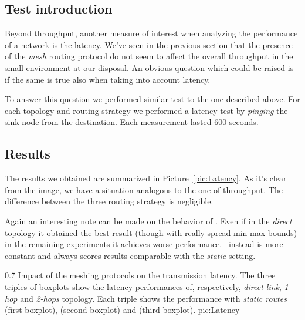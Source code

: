 \clearpage
\subsection{Test introduction}
    Beyond throughput, another measure of interest when analyzing the
    performance of a network is the latency. We've seen in the
    previous section that the presence of the \emph{mesh} routing
    protocol do not seem to affect the overall throughput in the small
    environment at our disposal. An obvious question which could be
    raised is if the same is true also when taking into account latency.

    To answer this question we performed similar test to the one
    described above. For each topology and routing strategy we
    performed a latency test by \emph{pinging} the sink node from the
    destination. Each measurement lasted 600 seconds.

\subsection{Results}
The results we obtained are summarized in
Picture~\ref{pic:Latency}. As it's clear from the image, we have a
situation analogous to the one of throughput. The difference between
the three routing strategy is negligible.

Again an interesting note can be made on the behavior of \olsr. Even
if in the \emph{direct} topology it obtained the best result (though
with really spread min-max bounds) in the remaining experiments it
achieves worse performance. \batman\ instead is more constant and
always scores results comparable with the \emph{static} setting.

        {0.7 \columnwidth}
        {Impact of the meshing protocols on the transmission latency. The
         three triples of boxplots show the latency performances of,
         respectively, \emph{direct link}, \emph{1-hop} and \emph{2-hops}
         topology. Each triple shows the performance with \emph{static
         routes} (first boxplot), \emph{\batman} (second boxplot) and
         \emph{\olsr} (third boxplot).}
        {pic:Latency}
